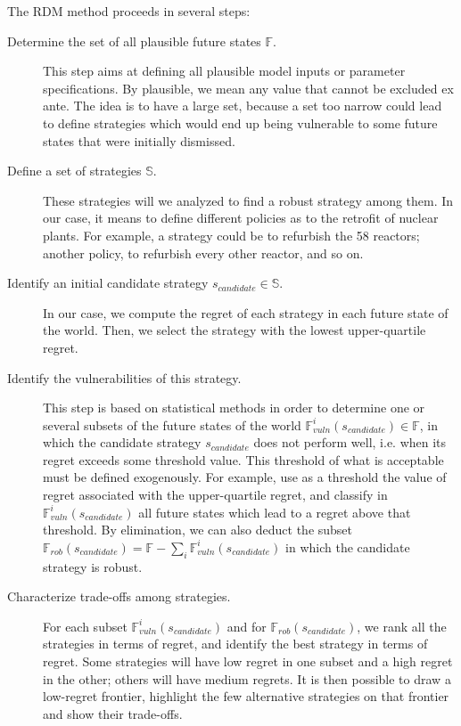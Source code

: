 The RDM method proceeds in several steps:
\begin{description}
	
	\item [Determine the set of all plausible future states $\mathbb{F}$.] This step aims at defining all plausible model inputs or parameter specifications. By plausible, we mean any value that cannot be excluded ex ante. The idea is to have a large set, because a set too narrow could lead to define strategies which would end up being vulnerable to some future states that were initially dismissed.
	
	\item [Define a set of strategies $\mathbb{S}$.] These strategies will we analyzed to find a robust strategy among them. In our case, it means to define different policies as to the retrofit of nuclear plants. For example, a strategy could be to refurbish the 58 reactors; another policy, to refurbish every other reactor, and so on.
	
	\item [Identify an initial candidate strategy $s_{candidate} \in \mathbb{S}$.] In our case, we compute the regret of each strategy in each future state of the world. Then, we select the strategy with the lowest upper-quartile regret.
	
	\item [Identify the vulnerabilities of this strategy.] This step is based on statistical methods in order to determine one or several subsets of the future states of the world $\mathbb{F}^i_{vuln}(s_{candidate}) \in \mathbb{F}$, in which the candidate strategy $s_{candidate}$ does not perform well, i.e. when its regret exceeds some threshold value. This threshold of what is acceptable must be defined exogenously. For example, \citet{Nahmmacher2016} use as a threshold the value of regret associated with the upper-quartile regret, and classify in $\mathbb{F}^i_{vuln}(s_{candidate})$ all future states which lead to a regret above that threshold.
	By elimination, we can also deduct the subset $\mathbb{F}_{rob}(s_{candidate}) = \mathbb{F} - \sum_i \mathbb{F}^i_{vuln}(s_{candidate})$ in which the candidate strategy is robust.
	
	\item [Characterize trade-offs among strategies.] For each subset $\mathbb{F}^i_{vuln}(s_{candidate})$ and for $\mathbb{F}_{rob}(s_{candidate})$, we rank all the strategies in terms of regret, and identify the best strategy in terms of regret.
	Some strategies will have low regret in one subset and a high regret in the other; others will have medium regrets. It is then possible to draw a low-regret frontier, highlight the few alternative strategies on that frontier and show their trade-offs.
	
\end{description} 

